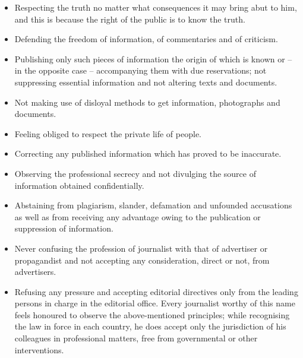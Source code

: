 \begin{itemize}
	\item Respecting the truth no matter what consequences it may bring abut to him, and this is because the right of the public is to know the truth.

	\item Defending the freedom of information, of commentaries and of criticism.

	\item Publishing only such pieces of information the origin of which is known or – in the opposite case – accompanying them with due reservations; not suppressing essential information and not altering texts and documents.

	\item Not making use of disloyal methods to get information, photographs and documents.

	\item Feeling obliged to respect the private life of people.

	\item Correcting any published information which has proved to be inaccurate.

	\item Observing the professional secrecy and not divulging the source of information obtained confidentially.

	\item Abstaining from plagiarism, slander, defamation and unfounded accusations as well as from receiving any advantage owing to the publication or suppression of information.

	\item Never confusing the profession of journalist with that of advertiser or propagandist and not accepting any consideration, direct or not, from advertisers.

	\item Refusing any pressure and accepting editorial directives only from the leading persons in charge in the editorial office. Every journalist worthy of this name feels honoured to observe the above-mentioned principles; while recognising the law in force in each country, he does accept only the jurisdiction of his colleagues in professional matters, free from governmental or other interventions.
\end{itemize}

	\pagebreak
